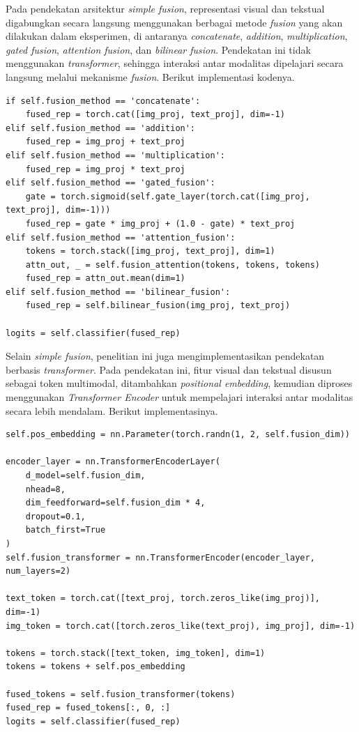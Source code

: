 Pada pendekatan arsitektur \textit{simple fusion}, representasi visual dan tekstual digabungkan secara langsung menggunakan berbagai metode \textit{fusion} yang akan dilakukan dalam eksperimen, di antaranya \textit{concatenate}, \textit{addition}, \textit{multiplication}, \textit{gated fusion}, \textit{attention fusion}, dan \textit{bilinear fusion}. Pendekatan ini tidak menggunakan \textit{transformer}, sehingga interaksi antar modalitas dipelajari secara langsung melalui mekanisme \textit{fusion}. Berikut implementasi kodenya.

\begin{lstlisting}[caption={Kode \textit{Simple Fusion} pada Model Multimodal}, label={code:4.multimodal_simple_fusion}]
if self.fusion_method == 'concatenate':
    fused_rep = torch.cat([img_proj, text_proj], dim=-1)
elif self.fusion_method == 'addition':
    fused_rep = img_proj + text_proj
elif self.fusion_method == 'multiplication':
    fused_rep = img_proj * text_proj
elif self.fusion_method == 'gated_fusion':
    gate = torch.sigmoid(self.gate_layer(torch.cat([img_proj, text_proj], dim=-1)))
    fused_rep = gate * img_proj + (1.0 - gate) * text_proj
elif self.fusion_method == 'attention_fusion':
    tokens = torch.stack([img_proj, text_proj], dim=1)
    attn_out, _ = self.fusion_attention(tokens, tokens, tokens)
    fused_rep = attn_out.mean(dim=1)
elif self.fusion_method == 'bilinear_fusion':
    fused_rep = self.bilinear_fusion(img_proj, text_proj)

logits = self.classifier(fused_rep)
\end{lstlisting}

Selain \textit{simple fusion}, penelitian ini juga mengimplementasikan pendekatan berbasis \textit{transformer}. Pada pendekatan ini, fitur visual dan tekstual disusun sebagai token multimodal, ditambahkan \textit{positional embedding}, kemudian diproses menggunakan \textit{Transformer Encoder} untuk mempelajari interaksi antar modalitas secara lebih mendalam. Berikut implementasinya.

\begin{lstlisting}[caption={Kode Transformer \textit{Fusion} pada Model Multimodal}, label={code:4.multimodal_transformer_fusion}]
self.pos_embedding = nn.Parameter(torch.randn(1, 2, self.fusion_dim))

encoder_layer = nn.TransformerEncoderLayer(
    d_model=self.fusion_dim,
    nhead=8,
    dim_feedforward=self.fusion_dim * 4,
    dropout=0.1,
    batch_first=True
)
self.fusion_transformer = nn.TransformerEncoder(encoder_layer, num_layers=2)

text_token = torch.cat([text_proj, torch.zeros_like(img_proj)], dim=-1)
img_token = torch.cat([torch.zeros_like(text_proj), img_proj], dim=-1)

tokens = torch.stack([text_token, img_token], dim=1)
tokens = tokens + self.pos_embedding

fused_tokens = self.fusion_transformer(tokens)
fused_rep = fused_tokens[:, 0, :]
logits = self.classifier(fused_rep)
\end{lstlisting}

